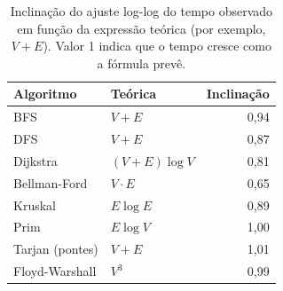 \begin{table}
  \caption{Inclinação do ajuste log-log do tempo observado em função da expressão teórica (por exemplo, $V+E$). Valor 1 indica que o tempo cresce como a fórmula prevê.}
  \label{tab:inclinacoes}
  \small
  \begin{tabular}{llr}
    \toprule
    Algoritmo & Teórica & Inclinação \\
    \midrule
    BFS & $V + E$ & 0,94 \\
    DFS & $V + E$ & 0,87 \\
    Dijkstra & $(V+E) \log V$ & 0,81 \\
    Bellman-Ford & $V\cdot E$ & 0,65 \\
    Kruskal & $E \log E$ & 0,89 \\
    Prim & $E \log V$ & 1,00 \\
    Tarjan (pontes) & $V + E$ & 1,01 \\
    Floyd-Warshall & $V^3$ & 0,99 \\
    \bottomrule
  \end{tabular}
\end{table}
